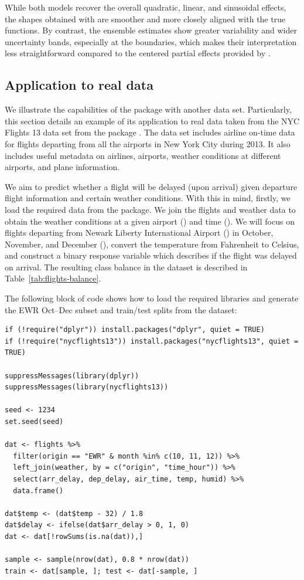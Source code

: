 While both models recover the overall quadratic, linear, and sinusoidal effects, the shapes obtained with  are smoother and more closely aligned with the true functions. By contrast, the  ensemble estimates show greater variability and wider uncertainty bands, especially at the boundaries, which makes their interpretation less straightforward compared to the centered partial effects provided by .
\subsection{Application to real data}

We illustrate the capabilities of the  package with another data set. Particularly, this section details an example of its application to real data taken from the NYC Flights 13 data set from the  package \citep{nycflights13}. The data set includes airline on-time data for flights departing from all the airports in New York City during 2013. It also includes useful metadata on airlines, airports, weather conditions at different airports, and plane information.

We aim to predict whether a flight will be delayed (upon arrival) given departure flight information and certain weather conditions. With this in mind, firstly, we load the required data from the  package. We join the flights and weather data to obtain the weather conditions at a given airport () and time (). We will focus on flights departing from Newark Liberty International Airport () in October, November, and December (), convert the temperature  from Fahrenheit to Celsius, and construct a binary response variable  which describes if the flight was delayed on arrival. The resulting class balance in the dataset is described in Table~\ref{tab:flights-balance}.

The following block of code shows how to load the required libraries and generate the EWR Oct–Dec subset and train/test splits from the  dataset:

\begin{Verbatim}
if (!require("dplyr")) install.packages("dplyr", quiet = TRUE)
if (!require("nycflights13")) install.packages("nycflights13", quiet = TRUE)

suppressMessages(library(dplyr))
suppressMessages(library(nycflights13))

seed <- 1234
set.seed(seed)

dat <- flights %>%
  filter(origin == "EWR" & month %in% c(10, 11, 12)) %>%
  left_join(weather, by = c("origin", "time_hour")) %>%
  select(arr_delay, dep_delay, air_time, temp, humid) %>%
  data.frame()

dat$temp <- (dat$temp - 32) / 1.8
dat$delay <- ifelse(dat$arr_delay > 0, 1, 0)
dat <- dat[!rowSums(is.na(dat)),]

sample <- sample(nrow(dat), 0.8 * nrow(dat))
train <- dat[sample, ]; test <- dat[-sample, ]
\end{Verbatim}

